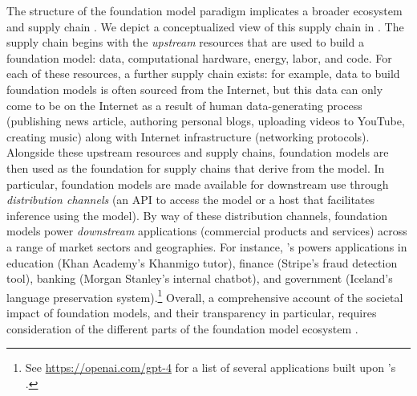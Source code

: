 \documentclass[screen, authorversion, acmsmall]{acmart}
\begin{document}
The structure of the foundation model paradigm implicates a broader ecosystem and supply chain \cite{bommasani2023ecosystem, cen2023supplychain, jones2023foundationmodels}.
We depict a conceptualized view of this supply chain in .
The supply chain begins with the \textit{upstream} resources that are used to build a foundation model: data, computational hardware, energy, labor, and code. 
For each of these resources, a further supply chain exists: for example, data to build foundation models is often sourced from the Internet, but this data can only come to be on the Internet as a result of human data-generating process (\eg publishing news article, authoring personal blogs, uploading videos to YouTube, creating music) along with Internet infrastructure (\eg networking protocols).
Alongside these upstream resources and supply chains, foundation models are then used as the foundation for supply chains that derive from the model.
In particular, foundation models are made available for downstream use through \textit{distribution channels} (\eg an API to access the model or a host that facilitates inference using the model).
By way of these distribution channels, foundation models power \textit{downstream} applications (\eg commercial products and services) across a range of market sectors and geographies.
For instance, \openai's \gptfour powers applications in education (\eg Khan Academy's Khanmigo tutor), finance (\eg Stripe's fraud detection tool), banking (\eg Morgan Stanley's internal chatbot), and government (\eg Iceland's language preservation system).\footnote{See \url{https://openai.com/gpt-4} for a list of several applications built upon \openai's \gptfour.}
Overall, a comprehensive account of the societal impact of foundation models, and their transparency in particular, requires consideration of the different parts of the foundation model ecosystem \citep[][\S1.2]{bommasani2021opportunities}.
\end{document}
